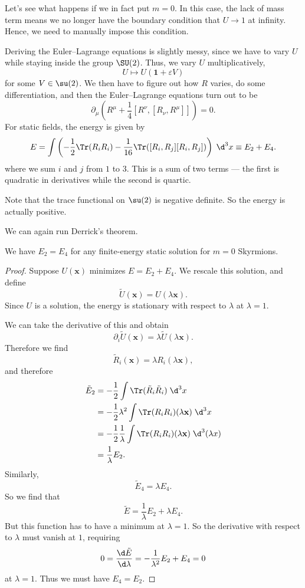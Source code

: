 \documentclass[a4paper]{article}
\begin{document}
Let's see what happens if we in fact put $m = 0$. In this case, the lack of mass term means we no longer have the boundary condition that $U \to 1$ at infinity. Hence, we need to manually impose this condition.

Deriving the Euler--Lagrange equations is slightly messy, since we have to vary $U$ while staying inside the group $\SU(2)$. Thus, we vary $U$ multiplicatively,
\[
  U \mapsto U (\mathbf{1} + \varepsilon V)
\]
for some $V \in \su(2)$. We then have to figure out how $R$ varies, do some differentiation, and then the Euler--Lagrange equations turn out to be
\[
  \partial_\mu \left(R^\mu + \frac{1}{4} [R^\nu, [R_\nu, R^\mu]]\right) = 0.
\]
For static fields, the energy is given by
\[
  E = \int \left(-\frac{1}{2} \Tr(R_i R_i) - \frac{1}{16} \Tr([R_i, R_j] [R_i, R_j])\right)\;\d^3 x \equiv E_2 + E_4.
\]
where we sum $i$ and $j$ from $1$ to $3$. This is a sum of two terms --- the first is quadratic in derivatives while the second is quartic.

Note that the trace functional on $\su(2)$ is negative definite. So the energy is actually positive.

We can again run Derrick's theorem.
\begin{thm}
  We have $E_2 = E_4$ for any finite-energy static solution for $m = 0$ Skyrmions.
\end{thm}

\begin{proof}
  Suppose $U(\mathbf{x})$ minimizes $E = E_2 + E_4$. We rescale this solution, and define
  \[
    \tilde{U}(\mathbf{x}) = U(\lambda \mathbf{x}).
  \]
  Since $U$ is a solution, the energy is stationary with respect to $\lambda$ at $\lambda = 1$.

  We can take the derivative of this and obtain
  \[
    \partial_i \tilde{U}(\mathbf{x}) = \lambda \tilde{U}(\lambda \mathbf{x}).
  \]
  Therefore we find
  \[
    \tilde{R}_i(\mathbf{x}) = \lambda R_i(\lambda \mathbf{x}),
  \]
  and therefore
  \begin{align*}
    \tilde{E}_2 &= - \frac{1}{2} \int \Tr(\tilde{R}_i \tilde{R}_i) \;\d^3 x\\
    &= - \frac{1}{2} \lambda^2 \int \Tr(R_i R_i)(\lambda \mathbf{x})\;\d^3 x\\
    &= - \frac{1}{2} \frac{1}{\lambda} \int \Tr(R_i R_i) (\lambda \mathbf{x})\;\d^3 (\lambda x)\\
    &= \frac{1}{\lambda} E_2.
  \end{align*}
  Similarly,
  \[
    \tilde{E}_4 = \lambda E_4.
  \]
  So we find that
  \[
    \tilde{E} = \frac{1}{\lambda} E_2 + \lambda E_4.
  \]
  But this function has to have a minimum at $\lambda = 1$. So the derivative with respect to $\lambda$ must vanish at $1$, requiring
  \[
    0 = \frac{\d \tilde{E}}{\d \lambda} = - \frac{1}{\lambda^2}E_2 + E_4 = 0
  \]
  at $\lambda = 1$. Thus we must have $E_4 = E_2$.
\end{proof}
\end{document}
